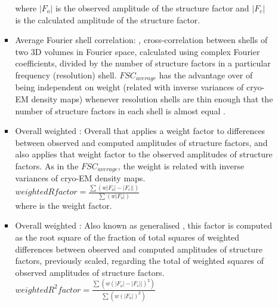 \begin{itemize}
\begin{itemize}
\begin{itemize}
     where $|F_o|$ is the observed amplitude of the structure factor and $|F_c|$ is the calculated amplitude of the structure factor.
     
     \item Average Fourier shell correlation: , cross-correlation between shells of two 3D volumes in Fourier space, calculated using complex Fourier coefficients, divided by the number of structure factors in a particular frequency (resolution) shell. \begin{math}FSC_{average}\end{math} has the advantage over  of being independent on weight (related with inverse variances of cryo-EM density maps) whenever resolution shells are thin enough that the number of structure factors in each shell is almost equal \citep{brown2015}.
     
     \item Overall weighted : Overall  that applies a weight factor to differences between observed and computed amplitudes of structure factors, and also applies that weight factor to the observed amplitudes of structure factors. As in the \begin{math}FSC_{average}\end{math}, the weight is related with inverse variances of cryo-EM density maps.\\
     
     \begin{math}
           weighted R factor = \frac{\sum(w |F_o|-|F_c||)}{\sum(w |F_o|)}
     \end{math}\\
     
     where  is the weight factor.
     
     \item Overall weighted : Also known as generalised , this factor is computed as the root square of the fraction of total squares of weighted differences between observed and computed amplitudes of structure factors, previously scaled, regarding the total of weighted squares of observed amplitudes of structure factors.\\
     
     \begin{math}
           weighted R^2 factor = \frac{\sum(w (|F_o|-|F_c||)^2)}{\sum(w (|F_o|)^2)}
     \end{math}\\
     

\end{itemize}
\end{itemize}
\end{itemize}
